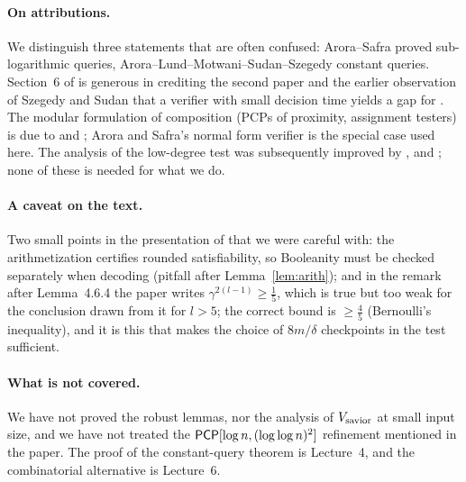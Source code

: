 \paragraph{On attributions.}
We distinguish three statements that are often confused: Arora--Safra proved sub-logarithmic queries, Arora--Lund--Motwani--Sudan--Szegedy constant queries.  Section~6 of \citet{AroraSafra98} is generous in crediting the second
paper and the earlier observation of Szegedy and Sudan that a verifier with small decision time yields a gap for .  The modular formulation of composition (PCPs of proximity, assignment testers) is
due to \citet{BGHSV06} and \citet{DR04}; Arora and Safra's normal form verifier is the special case used here.  The analysis of the low-degree test was subsequently improved by \citet{RubinfeldSudan92},
\citet{PolishchukSpielman94} and \citet{AroraSudan97}; none of these is needed for what we do.

\paragraph{A caveat on the text.}
Two small points in the presentation of \citet{AroraSafra98} that we were careful with: the arithmetization certifies rounded satisfiability, so Booleanity must be checked separately when decoding
(pitfall after Lemma~\ref{lem:arith}); and in the remark after Lemma~4.6.4 the paper writes $\gamma^{2(l-1)}\ge\tfrac15$, which is true but too weak for the conclusion drawn from it for $l>5$; the correct bound is $\ge\tfrac45$ (Bernoulli's inequality), and
it is this that makes the choice of $8m/\delta$ checkpoints in the test sufficient.

\paragraph{What is not covered.}
We have not proved the robust lemmas, nor the analysis of $V_{\rm savior}$ at small input size, and we have not treated the $\mathsf{PCP}[\log n,(\log\log n)^2]$ refinement mentioned in the paper.
The proof of the constant-query theorem is Lecture~4, and the combinatorial alternative is Lecture~6.
